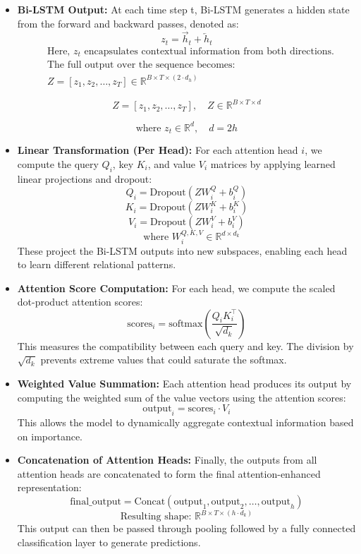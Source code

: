 \documentclass{article}
\begin{document}
\begin{itemize}
\item \textbf{Bi-LSTM Output:} At each time step t, Bi-LSTM generates a hidden state from the forward and backward passes, denoted as:
\[
z_t = \overrightarrow{h}_t + \overleftarrow{h}_t
\]
\[
\begin{aligned}
&\text{Here, } z_t \text{ encapsulates contextual information from both directions.} \\
&\text{The full output over the sequence becomes:} \\
&Z = [z_1, z_2, \ldots, z_T] \in \mathbb{R}^{B \times T \times (2 \cdot d_h)}
\end{aligned}
\]

\[
Z = [z_1, z_2, \dots, z_T], \quad Z \in \mathbb{R}^{B \times T \times d}
\]

\[
\text{where } z_t \in \mathbb{R}^{d}, \quad d = 2h
\]

\item \textbf{Linear Transformation (Per Head):} For each attention head $i$, we compute the query $Q_i$, key $K_i$, and value $V_i$ matrices by applying learned linear projections and dropout:
\[
Q_i = \text{Dropout}(Z W_i^Q + b_i^Q)
\]
\[
K_i = \text{Dropout}(Z W_i^K + b_i^K)
\]
\[
V_i = \text{Dropout}(Z W_i^V + b_i^V)
\]
\[
\quad \text{where } W_i^{Q,K,V} \in \mathbb{R}^{d \times d_k}
\]
These project the Bi-LSTM outputs into new subspaces, enabling each head to learn different relational patterns.

\item \textbf{Attention Score Computation:} For each head, we compute the scaled dot-product attention scores:
\[
\text{scores}_i = \text{softmax}\left( \frac{Q_i K_i^\top}{\sqrt{d_k}} \right)
\]
This measures the compatibility between each query and key. The division by $\sqrt{d_k}$ prevents extreme values that could saturate the softmax.

\item \textbf{Weighted Value Summation:} Each attention head produces its output by computing the weighted sum of the value vectors using the attention scores:
\[
\text{output}_i = \text{scores}_i \cdot V_i
\]
This allows the model to dynamically aggregate contextual information based on importance.

\item \textbf{Concatenation of Attention Heads:} Finally, the outputs from all attention heads are concatenated to form the final attention-enhanced representation:
\[
\text{final\_output} = \text{Concat}(\text{output}_1, \text{output}_2, \dots, \text{output}_h)
\]
\[
\text{Resulting shape: } \mathbb{R}^{B \times T \times (h \cdot d_k)}
\]
This output can then be passed through pooling followed by a fully connected classification layer to generate predictions.

\end{itemize}
\end{document}
